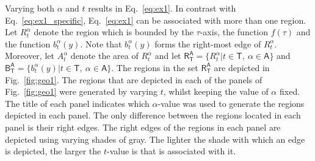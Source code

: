 \documentclass{article}
\theoremstyle{theorem}
\theoremstyle{definition}
\begin{document}
\noindent
Varying both $\alpha$ and $t$ results in Eq.~\eqref{eq:ex1}. In contrast with Eq.~\eqref{eq:ex1_specific}, Eq.~\eqref{eq:ex1} can be associated with more than one region. 
Let $R_{t}^{\alpha}$ denote the region which is bounded by the $\tau$-axis, the function $f(\tau)$ and the function $b_{t}^{\alpha}(y)$. Note that $b_{t}^{\alpha}(y)$ forms the 
right-most edge of $R_{t}^{\alpha}$. Moreover, let $A_{t}^{\alpha}$ denote the area of $R_{t}^{\alpha}$ and let $\mathsf{R}_{\mathsf{T}}^{\mathsf{A}}=\{R_t^{\alpha}|t\in\mathsf{T},~\alpha\in\mathsf{A}\}$ and 
$\mathsf{B}_{\mathsf{T}}^{\mathsf{A}}=\{b_t^{\alpha}(y)|t\in\mathsf{T},~\alpha\in\mathsf{A}\}$. 
The regions in the set $\mathsf{R}_{\mathsf{T}}^{\mathsf{A}}$ are depicted in Fig.~\ref{fig:geo1}. The regions that are depicted in each of the panels of Fig.~\ref{fig:geo1} were generated by varying $t$, whilst keeping the value of $\alpha$ fixed. 
The title of each panel indicates which $\alpha$-value was used to generate the regions depicted in each panel. The only difference between the regions located in each 
panel is their right edges. The right edges of the regions in each panel are depicted using varying shades of gray. The lighter the shade with which an edge is depicted, 
the larger the $t$-value is that is associated with it.\\
\end{document}

